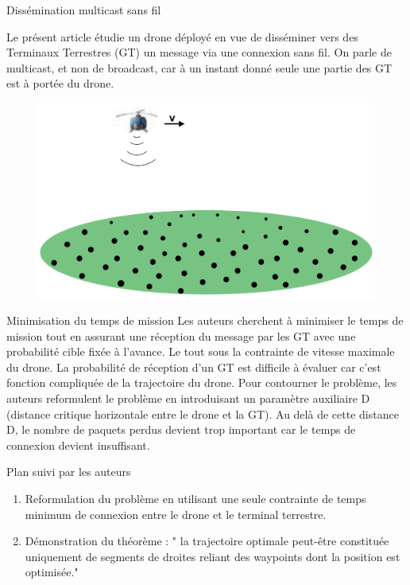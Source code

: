 \begin{frame}{Dissémination multicast sans fil}

Le présent article étudie un drone déployé en vue de disséminer vers des Terminaux Terrestres (GT) un message via une connexion sans fil. On parle de multicast, et non de broadcast, car à un instant donné seule une partie des GT est à portée du drone.

\begin{figure}
	\centering
	\includegraphics[width=0.7\linewidth]{images/multicast}
	\caption{}
	\label{fig:multicast}
\end{figure}

\end{frame}

\begin{frame}{Minimisation du temps de mission}
Les auteurs cherchent à minimiser le temps de mission tout en assurant une réception du message par les GT avec une probabilité cible fixée à l'avance. Le tout sous la contrainte de vitesse maximale du drone. La probabilité de réception d'un GT est difficile à évaluer car c'est fonction compliquée de la trajectoire du drone. Pour contourner le problème, les auteurs reformulent le problème en introduisant un paramètre auxiliaire D (distance critique horizontale entre le drone et la GT). Au delà de cette distance D, le nombre de paquets perdus devient trop important car le temps de connexion devient insuffisant. 


\end{frame}


\newcommand{\asuivre}{\setcounter{sauvegardeenumi}{\theenumi}}
\newcommand{\suite}{\setcounter{enumi}{\thesauvegardeenumi}}

\begin{frame}{Plan suivi par les auteurs}

\begin{enumerate}
	
	\item Reformulation du problème en utilisant une seule contrainte
	de temps minimum de connexion entre le drone et le terminal terrestre.	
	\item Démonstration du théorème : " la trajectoire optimale
	peut-être constituée uniquement de segments de droites reliant des
	waypoints dont la position est optimisée."

	
\end{enumerate}
\asuivre
\end{frame}

